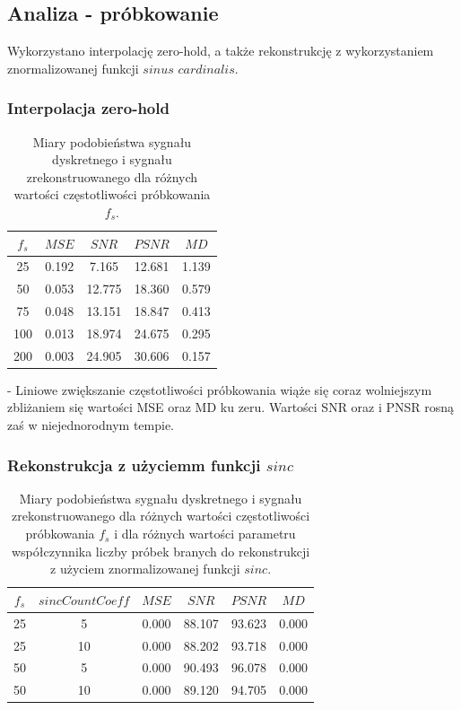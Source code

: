 \documentclass{article}
\begin{document}
\subsection{Analiza - próbkowanie}
Wykorzystano interpolację zero-hold, a także rekonstrukcję z wykorzystaniem znormalizowanej funkcji $sinus$ $cardinalis$.
\subsubsection{Interpolacja zero-hold}
\begin{table}[H]
\centering
\begin{tabular}{|c | c | c | c | c|}
 \hline
 $f_s$ & $MSE$ & $SNR$ & $PSNR$ & $MD$ \\
 \hline
 25 & 0.192 & 7.165 & 12.681 & 1.139 \\
 \hline
 50 & 0.053 & 12.775 & 18.360 & 0.579 \\
 \hline
 75 & 0.048 & 13.151 & 18.847 & 0.413 \\
 \hline
 100 & 0.013 & 18.974 & 24.675 & 0.295 \\
 \hline
 200 & 0.003 & 24.905 & 30.606 & 0.157 \\
 \hline
\end{tabular}
\caption{Miary podobieństwa sygnału dyskretnego i sygnału zrekonstruowanego dla różnych wartości częstotliwości próbkowania $f_s$.}
\label{table:zero_hold_sampling}
\end{table}

- Liniowe zwiększanie częstotliwości próbkowania wiąże się coraz wolniejszym zbliżaniem się wartości MSE oraz MD ku zeru. Wartości SNR oraz i PNSR rosną zaś w niejednorodnym tempie.

\subsubsection{Rekonstrukcja z użyciemm funkcji $sinc$}
\begin{table}[H]
\centering
\begin{tabular}{|c | c | c | c | c | c|}
 \hline
 $f_s$ & $sincCountCoeff$ & $MSE$ & $SNR$ & $PSNR$ & $MD$ \\
 \hline
 25 & 5 & 0.000 & 88.107 & 93.623 & 0.000 \\
 \hline
 25 & 10 & 0.000 & 88.202 & 93.718 & 0.000 \\
 \hline
 50 & 5 & 0.000 & 90.493 & 96.078 & 0.000 \\
 \hline
 50 & 10 & 0.000 & 89.120 & 94.705 & 0.000 \\
 \hline
\end{tabular}
\caption{Miary podobieństwa sygnału dyskretnego i sygnału zrekonstruowanego dla różnych wartości częstotliwości próbkowania $f_s$ i dla różnych wartości parametru współczynnika liczby próbek branych do rekonstrukcji z użyciem znormalizowanej funkcji $sinc$.}
\label{table:sinc_sampling}
\end{table}
\end{document}
